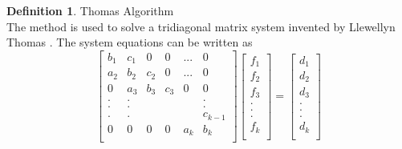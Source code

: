 \documentclass[12pt, oneside]{book}
\theoremstyle{plain}
\theoremstyle{definition}
\newtheorem{definition}[theorem]{Definition}
\begin{document}
\begin{definition} Thomas Algorithm \\
The method is used to solve a tridiagonal matrix system invented by Llewellyn Thomas \cite{thomas}. The system equations can be written as
$$
\begin{bmatrix}  
b_1 & c_1 & 0 & 0 & ... & 0 \\ 
a_2 & b_2 & c_2 & 0 & ... & 0 \\ 
0 & a_3 & b_3 & c_3 & 0 & 0 \\ 
. & . &  &  &  & . \\ 
. & . &  &  &  & . \\ 
. & . &  &  &  & c_{k-1} \\ 
0 & 0 & 0 & 0 & a_k & b_k \\ 
\end{bmatrix} \begin{bmatrix}  
f_1 \\ 
f_2 \\ 
f_3 \\ 
.\\ 
.\\ 
.\\ 
f_k \\ 
\end{bmatrix} = \begin{bmatrix} 
d_1 \\ 
d_2 \\ 
d_3 \\ 
.\\ 
.\\ 
.\\ 
d_k \\ 
\end{bmatrix}
$$



\end{definition}
\end{document}
